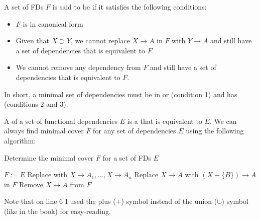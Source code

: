       \par A set of FDs $F$ is said to be  if it satisfies the following conditions:
      \begin{itemize}
        \item $F$ is in canonical form
        \item Given that $X \supset Y$, we cannot replace $X \to A$ in $F$ with $Y \to A$ and still have a set of dependencies that is equivalent to $F$.
        \item We cannot remove any dependency from $F$ and still have a set of dependencies that is equivalent to $F$.
      \end{itemize}
      \par In short, a minimal set of dependencies must be in  or  (condition 1) and has  (conditions 2 and 3).
    
      \par A  of a set of functional dependencies $E$ is a  that is equivalent to $E$. We can always find  minimal cover $F$ for any set of dependencies $E$ using the following algorithm:
        \begin{algorithm}[H]
          \caption{Determine the minimal cover $F$ for a set of FDs $E$}
          \begin{algorithmic}[1]
            \State $F := E$
              \State Replace with $X \to A_1, \ldots, X \to A_n$
            \EndFor
                  \State Replace $X \to A$ with $(X - \{B\}) \to A$ in $F$
                \EndIf
              \EndFor
            \EndFor
                \State Remove $X \to A$ from $F$
              \EndIf
            \EndFor
          \end{algorithmic}
        \end{algorithm}
      \par Note that on line 6 I used the plus ($+$) symbol instead of the union ($\cup$) symbol (like in the book) for easy-reading.

